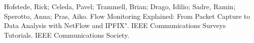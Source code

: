 \begin{thebibliography}{9}

Hofstede, Rick; Celeda, Pavel; Trammell, Brian; Drago, Idilio; Sadre, Ramin; Sperotto, Anna; Pras, Aiko. Flow Monitoring Explained: From Packet Capture to Data Analysis with NetFlow and IPFIX". IEEE Communications Surveys Tutorials. IEEE Communications Society.

\end{thebibliography}
